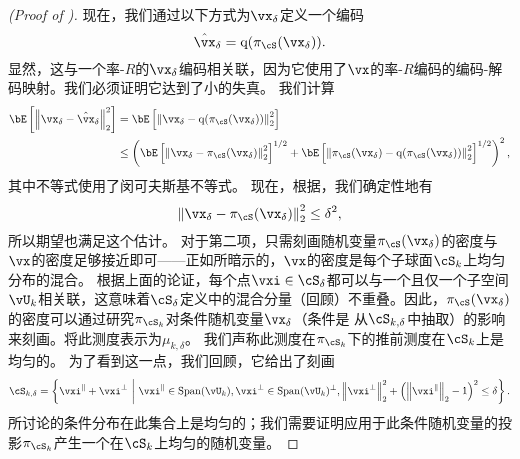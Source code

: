 \documentclass[../../book-main.tex]{subfiles}
\begin{document}
\begin{proof}[(Proof of )]
    现在，我们通过以下方式为$\vx_{\delta}$定义一个编码
    \begin{equation}
        \hat{\vx}_{\delta} = \mathrm{q}( \pi_{\cS}(\vx_{\delta}) ).
    \end{equation}
    显然，这与一个率-$R$的$\vx_{\delta}$编码相关联，因为它使用了$\vx$的率-$R$编码的编码-解码映射。我们必须证明它达到了小的失真。
    我们计算
    \begin{align}
        \bE\left[ \norm*{ \vx_{\delta} - \hat{\vx}_{\delta} }_2^2 \right]
        &=
        \bE\left[ \norm*{ \vx_{\delta} - \mathrm{q}(\pi_{\cS}(\vx_{\delta})) }_2^2 \right]
        \\
        &\leq
        \left(
        \bE\left[ \norm*{ \vx_{\delta} - \pi_{\cS}(\vx_{\delta}) }_2^2
        \right]^{1/2}
        + \bE\left[ \norm*{ \pi_{\cS}(\vx_{\delta})
        - \mathrm{q}(\pi_{\cS}(\vx_{\delta})) }_2^2 \right]^{1/2}
        \right)^2,\label{eq:distortion-decomposition}
    \end{align}
    其中不等式使用了闵可夫斯基不等式。
    现在，根据，我们确定性地有
    \begin{equation}
        \norm*{ \vx_{\delta} - \pi_{\cS}(\vx_{\delta}) }_2^2
        \leq \delta^2,
    \end{equation}
    所以期望也满足这个估计。
    对于第二项，只需刻画随机变量$\pi_{\cS}(\vx_{\delta})$的密度与$\vx$的密度足够接近即可——正如所暗示的，$\vx$的密度是每个子球面$\cS_k$上均匀分布的混合。
    根据上面的论证，每个点$\vxi \in \cS_{\delta}$都可以与一个且仅一个子空间$\vU_k$相关联，这意味着$\cS_{\delta}$定义中的混合分量（回顾）不重叠。因此，$\pi_{\cS}(\vx_{\delta})$的密度可以通过研究$\pi_{\cS_k}$对条件随机变量$\vx_{\delta}$（条件是 从$\cS_{k, \delta}$中抽取）的影响来刻画。将此测度表示为$\mu_{k, \delta}$。
    我们声称此测度在$\pi_{\cS_k}$下的推前测度在$\cS_k$上是均匀的。
    为了看到这一点，我们回顾，它给出了刻画
    \begin{equation}
        \cS_{k, \delta} = \set*{
            \vxi^{\|} + \vxi^{\perp} 
            \given 
            \vxi^{\|} \in \Span(\vU_k),
            \vxi^{\perp} \in \Span(\vU_k)^\perp,
            \norm*{\vxi^{\perp}}_2^2
            + \left( \norm*{\vxi^{\|}}_2 - 1 \right)^2
            \leq
            \delta
        }.
    \end{equation}
    所讨论的条件分布在此集合上是均匀的；我们需要证明应用于此条件随机变量的投影$\pi_{\cS_k}$产生一个在$\cS_k$上均匀的随机变量。

\end{proof}
\end{document}
